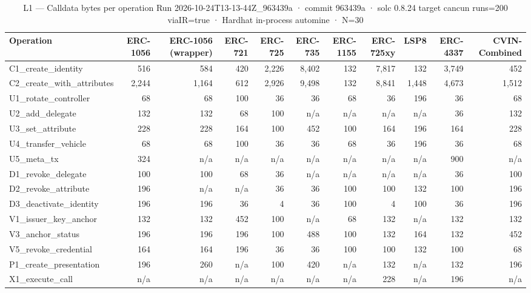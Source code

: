 \begin{table}[ht]
\centering
\small
\begin{tabular}{lrrrrrrrrrr}
\toprule
Operation & ERC-1056 & ERC-1056 (wrapper) & ERC-721 & ERC-725 & ERC-735 & ERC-1155 & ERC-725xy & LSP8 & ERC-4337 & CVIN-Combined \\
\midrule
C1\_create\_identity & 516 & 584 & 420 & 2,226 & 8,402 & 132 & 7,817 & 132 & 3,749 & 452 \\
C2\_create\_with\_attributes & 2,244 & 1,164 & 612 & 2,926 & 9,498 & 132 & 8,841 & 1,448 & 4,673 & 1,512 \\
U1\_rotate\_controller & 68 & 68 & 100 & 36 & 36 & 68 & 36 & 196 & 36 & 68 \\
U2\_add\_delegate & 132 & 132 & 68 & 100 & n/a & n/a & n/a & n/a & 36 & 132 \\
U3\_set\_attribute & 228 & 228 & 164 & 100 & 452 & 100 & 164 & 196 & 164 & 228 \\
U4\_transfer\_vehicle & 68 & 68 & 100 & 36 & 36 & 68 & 36 & 196 & 36 & 68 \\
U5\_meta\_tx & 324 & n/a & n/a & n/a & n/a & n/a & n/a & n/a & 900 & n/a \\
D1\_revoke\_delegate & 100 & 100 & 68 & 36 & n/a & n/a & n/a & n/a & 36 & 100 \\
D2\_revoke\_attribute & 196 & n/a & n/a & 36 & 36 & 100 & 100 & 132 & 100 & 196 \\
D3\_deactivate\_identity & 196 & 196 & 36 & 4 & 36 & 100 & 4 & 100 & 36 & 196 \\
V1\_issuer\_key\_anchor & 132 & 132 & 452 & 100 & n/a & 68 & 132 & n/a & 132 & 132 \\
V3\_anchor\_status & 196 & 196 & 196 & 100 & 488 & 100 & 132 & 164 & 132 & 452 \\
V5\_revoke\_credential & 164 & 164 & 196 & 36 & 36 & 100 & 100 & 132 & 100 & 68 \\
P1\_create\_presentation & 196 & 260 & n/a & 100 & 420 & n/a & 132 & n/a & 132 & 196 \\
X1\_execute\_call & n/a & n/a & n/a & n/a & n/a & n/a & 228 & n/a & 196 & n/a \\
\bottomrule
\end{tabular}
\caption{L1 — Calldata bytes per operation Run 2026-10-24T13-13-44Z\_963439a · commit 963439a · solc 0.8.24 target cancun runs=200 viaIR=true · Hardhat in-process automine · N=30}
\label{tab:crud_calldata}
\end{table}
